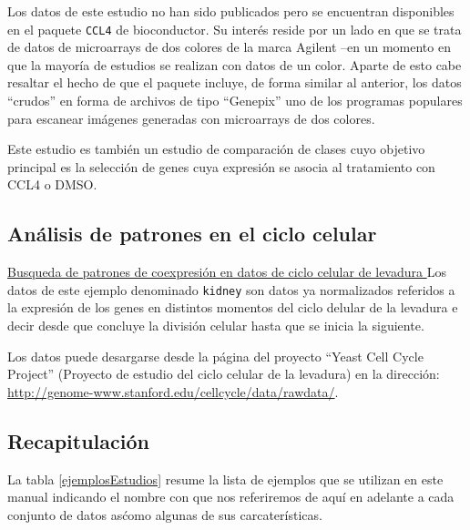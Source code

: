Los datos de este estudio no han sido publicados pero se encuentran disponibles en el paquete \texttt{CCL4} de bioconductor. Su inter\'es reside por un lado en que se trata de datos de microarrays de dos colores de la marca Agilent --en un momento en que la mayor\'ia de estudios se realizan con datos de un color. Aparte de esto cabe resaltar el hecho de que el paquete incluye, de forma similar al anterior, los datos ``crudos'' en forma de archivos de tipo ``Genepix'' uno de los programas populares para escanear im\'agenes generadas con microarrays de dos colores.

Este estudio es tambi\'en un estudio de comparaci\'on de clases cuyo objetivo principal es la selecci\'on de genes cuya expresi\'on se asocia al tratamiento con CCL4 o DMSO.


\subsection{An\'alisis de patrones en el ciclo celular\label{yeast}}

\underline{Busqueda de patrones de coexpresi\'on en datos de ciclo celular de levadura
}
Los datos de este ejemplo denominado \texttt{kidney} son datos ya normalizados referidos a la expresi\'on de los genes en distintos momentos del ciclo delular de la levadura e decir desde que concluye la divisi\'on celular hasta que se inicia la siguiente.

Los datos puede desargarse desde la p\'agina del proyecto ``Yeast Cell Cycle Project'' (Proyecto de estudio del ciclo celular de la levadura) en la direcci\'on:\\
\href{http://genome-www.stanford.edu/cellcycle/data/rawdata/}{http://genome-www.stanford.edu/cellcycle/data/rawdata/}.


\subsection{Recapitulaci\'on}

La tabla \ref{ejemplosEstudios} resume la lista de ejemplos que se utilizan en este manual indicando el nombre con que nos referiremos de aqu\'i en adelante a cada conjunto de datos as\' como algunas de sus carcater\'isticas.

